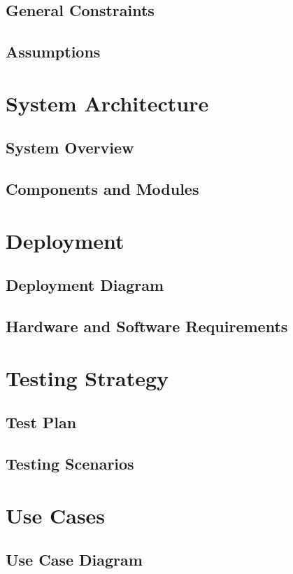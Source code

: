 \documentclass{report}
\begin{document}
\section{General Constraints}
\section{Assumptions}

\chapter{System Architecture}
\section{System Overview}
\section{Components and Modules}

\chapter{Deployment}
\section{Deployment Diagram}
\section{Hardware and Software Requirements}

\chapter{Testing Strategy}
\section{Test Plan}
\section{Testing Scenarios}

\chapter{Use Cases}
\section{Use Case Diagram}
\end{document}
